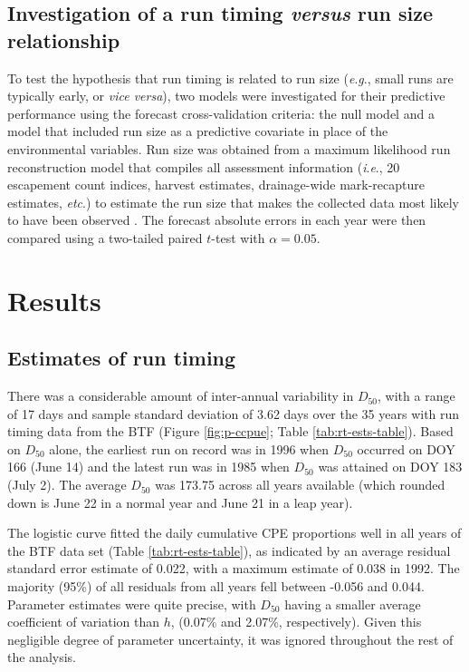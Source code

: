 \documentclass[12pt,]{book}
\theoremstyle{definition}
\theoremstyle{definition}
\theoremstyle{definition}
\theoremstyle{remark}
\begin{document}
\subsection{\texorpdfstring{Investigation of a run timing \emph{versus}
run size
relationship}{Investigation of a run timing versus run size relationship}}\label{investigation-of-a-run-timing-versus-run-size-relationship}

\noindent
To test the hypothesis that run timing is related to run size
(\emph{e}.\emph{g}., small runs are typically early, or \emph{vice
versa}), two models were investigated for their predictive performance
using the forecast cross-validation criteria: the null model and a model
that included run size as a predictive covariate in place of the
environmental variables. Run size was obtained from a maximum likelihood
run reconstruction model that compiles all assessment information
(\emph{i}.\emph{e}., 20 escapement count indices, harvest estimates,
drainage-wide mark-recapture estimates, \emph{etc}.) to estimate the run
size that makes the collected data most likely to have been observed
\citep{bue-etal-2012, liller-etal-2018}. The forecast absolute errors in
each year were then compared using a two-tailed paired \(t\)-test with
\(\alpha = 0.05\).

\section{Results}\label{results}

\subsection{Estimates of run timing}\label{estimates-of-run-timing}

\noindent
There was a considerable amount of inter-annual variability in
\(D_{50}\), with a range of 17 days and sample standard deviation of
3.62 days over the 35 years with run timing data from the BTF (Figure
\ref{fig:p-ccpue}; Table \ref{tab:rt-ests-table}). Based on \(D_{50}\)
alone, the earliest run on record was in 1996 when \(D_{50}\) occurred
on DOY 166 (June 14) and the latest run was in 1985 when \(D_{50}\) was
attained on DOY 183 (July 2). The average \(D_{50}\) was 173.75 across
all years available (which rounded down is June 22 in a normal year and
June 21 in a leap year).

The logistic curve fitted the daily cumulative CPE proportions well in
all years of the BTF data set (Table \ref{tab:rt-ests-table}), as
indicated by an average residual standard error estimate of 0.022, with
a maximum estimate of 0.038 in 1992. The majority (95\%) of all
residuals from all years fell between -0.056 and 0.044. Parameter
estimates were quite precise, with \(D_{50}\) having a smaller average
coefficient of variation than \(h\), (0.07\% and 2.07\%, respectively).
Given this negligible degree of parameter uncertainty, it was ignored
throughout the rest of the analysis.
\end{document}
